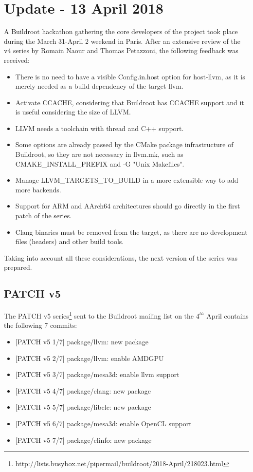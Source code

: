 \documentclass[12pt,a4paper,oneside]{article}
\begin{document}
\section*{Update - 13 April 2018}
A Buildroot hackathon gathering the core developers of the project took place
during the March 31-April 2 weekend in Paris. After an extensive review of the
v4 series by Romain Naour and Thomas Petazzoni, the following feedback was
received:
\begin{itemize}
  \item There is no need to have a visible Config.in.host option for host-llvm,
  as it is merely needed as a build dependency of the target llvm.
  \item Activate CCACHE, considering that Buildroot has CCACHE support and it
  is useful considering the size of LLVM.
  \item LLVM needs a toolchain with thread and C++ support.
  \item Some options are already passed by the CMake package infrastructure of
  Buildroot, so they are not necessary in llvm.mk, such as CMAKE\_INSTALL\_PREFIX
  and -G "Unix Makefiles".
  \item Manage LLVM\_TARGETS\_TO\_BUILD in a more extensible way to add more backends.
  \item Support for ARM and AArch64 architectures should go directly in the
  first patch of the series.
  \item Clang binaries must be removed from the target, as there are no development
  files (headers) and other build tools.
\end{itemize}
Taking into account all these considerations, the next version of the series
was prepared.

\subsection*{PATCH v5}
The PATCH v5 series\footnote{http://lists.busybox.net/pipermail/buildroot/2018-April/218023.html}
sent to the Buildroot mailing list on the $4^{th}$ April contains the  following
7 commits:
\begin{itemize}
  \item {[PATCH v5 1/7]} package/llvm: new package
  \item {[PATCH v5 2/7]} package/llvm: enable AMDGPU
  \item {[PATCH v5 3/7]} package/mesa3d: enable llvm support
  \item {[PATCH v5 4/7]} package/clang: new package
  \item {[PATCH v5 5/7]} package/libclc: new package
  \item {[PATCH v5 6/7]} package/mesa3d: enable OpenCL support
  \item {[PATCH v5 7/7]} package/clinfo: new package
\end{itemize}
\newpage
\end{document}

